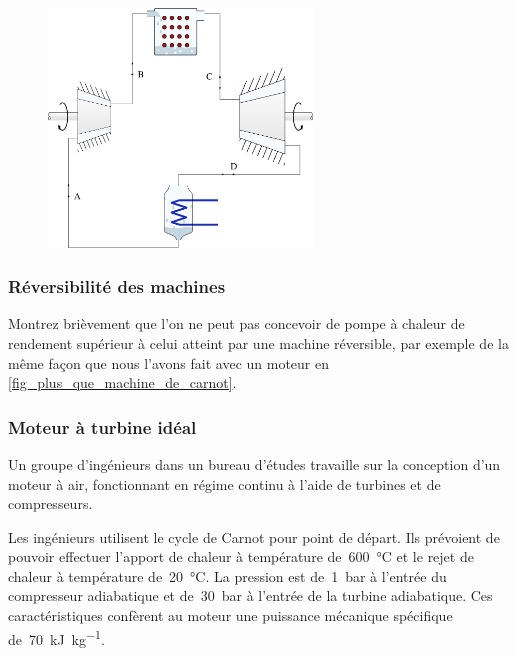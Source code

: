 	\begin{figure}[hc!]
		\begin{center}
			\includegraphics[width=7cm]{images/circuit_carnot_vapeur.png}
		\end{center}
		\label{fig_exo_carnot_circuit_vapeur}
	\end{figure}

\subsubsection{Réversibilité des machines}
\label{exo_thermopompe_plusplus}

	Montrez brièvement que l’on ne peut pas concevoir de pompe à chaleur de rendement supérieur à celui atteint par une machine réversible, par exemple de la même façon que nous l’avons fait avec un moteur en \cref{fig_plus_que_machine_de_carnot}.


\subsubsection{Moteur à turbine idéal}
\label{exo_moteur_turbine_ideal}
\wherefrom{[DS n°2 2012, 11pts]}

	Un groupe d’ingénieurs dans un bureau d’études travaille sur la conception d’un moteur à air, fonctionnant en régime continu à l’aide de turbines et de compresseurs.

	Les ingénieurs utilisent le cycle de Carnot pour point de départ. Ils prévoient de pouvoir effectuer l’apport de chaleur à température de~\SI{600}{\degreeCelsius} et le rejet de chaleur à température de~\SI{20}{\degreeCelsius}. La pression est de~\SI{1}{\bar} à l’entrée du compresseur adiabatique et de~\SI{30}{\bar} à l’entrée de la turbine adiabatique. Ces caractéristiques confèrent au moteur une puissance mécanique spécifique de~\SI{70}{\kilo\joule\per\kilogram}.

